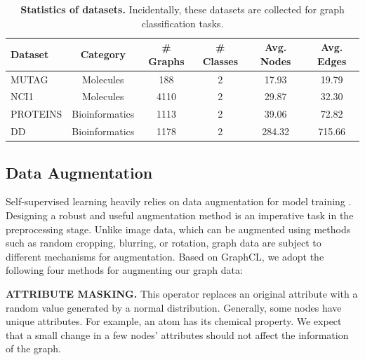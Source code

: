 \begin{table}[!htbp]
\centering
\begin{adjustwidth}{-.5in}{-.5in}  
\begin{tabular}{l|c|c|c|c|c}
\toprule
Dataset & Category & \# Graphs & \# Classes & Avg. Nodes & Avg. Edges \\ 
\midrule
MUTAG \cite{mutag} & Molecules & 188 & 	2	&17.93&	19.79 \\
NCI1 \cite{nci1} & Molecules & 4110	&2&	29.87&	32.30 \\
\midrule
PROTEINS \cite{proteins} & Bioinformatics & 1113	&2	&39.06&	72.82 \\
DD \cite{proteins} & Bioinformatics & 1178&	2	&284.32&	715.66 \\
\bottomrule
\end{tabular}
\end{adjustwidth}
\vspace{0.5cm}
\caption[Statistics of datasets]{\textbf{Statistics of datasets.} Incidentally, these datasets are collected for graph classification tasks. }
		\label{tab:dataset}
	
	
	\end{table}


	
\subsection{Data Augmentation}

Self-supervised learning heavily relies on data augmentation for model training \cite{ding2022data, zhao2022graph}. Designing a robust and useful augmentation method is an imperative task in the preprocessing stage. Unlike image data, which can be augmented using methods such as random cropping, blurring, or rotation, graph data are subject to different mechanisms for augmentation. Based on GraphCL, we adopt the following four methods for augmenting our graph data:


\textbf{\uppercase{attribute masking.}} This operator replaces an original attribute with a random value generated by a normal distribution. Generally, some nodes have unique attributes. For example, an atom has its chemical property. We expect that a small change in a few nodes' attributes should not affect the information of the graph. 
		
